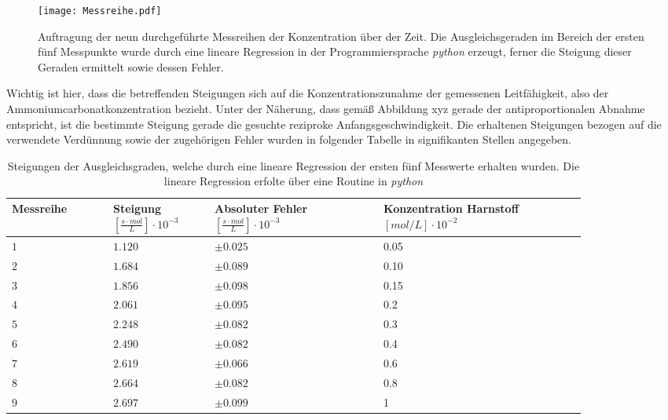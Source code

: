 \begin{figure}[H]
	\centering	
	\begin{minipage}{1\textwidth}
		\texttt{[image: Messreihe.pdf]}
	\end{minipage}
	\caption{Auftragung der neun durchgeführte Messreihen der Konzentration über der Zeit. Die Ausgleichsgeraden im Bereich der ersten fünf Messpunkte wurde durch eine lineare Regression in der Programmiersprache \textit{python} erzeugt, ferner die Steigung dieser Geraden ermittelt sowie dessen Fehler.}
	\label{Messreihe}
\end{figure}
Wichtig ist hier, dass die betreffenden Steigungen sich auf die Konzentrationszunahme der gemessenen Leitfähigkeit, also der Ammoniumcarbonatkonzentration bezieht. Unter der Näherung, dass gemäß Abbildung xyz gerade der antiproportionalen Abnahme entspricht, ist die bestimmte Steigung gerade die gesuchte reziproke Anfangsgeschwindigkeit. Die erhaltenen Steigungen bezogen auf die verwendete Verdünnung sowie der zugehörigen Fehler wurden in folgender Tabelle in signifikanten Stellen angegeben.
\begin{table}[H]
\centering
\label{Steigungstabelle}
	\caption{Steigungen der Ausgleichsgraden, welche durch eine lineare Regression der ersten fünf Messwerte erhalten wurden. Die lineare Regression erfolte über eine Routine in \textit{python}}
	\begin{tabular}{C{0.15\linewidth}|C{0.15\linewidth}C{0.25\linewidth}C{0.3\linewidth}}
		Messreihe  &  Steigung $\left[\si{\frac{s\cdot mol}{L}}\right] \cdot 10^{-3}$ &  Absoluter Fehler $\left[\si{\frac{s \cdot mol}{L}}\right] \cdot 10^{-3}$ & Konzentration Harnstoff $\left[\si{mol/L}\right]\cdot 10^{-2}$ \\
		\hline \addlinespace[1ex] 
		$ 1$ & $1.120$ & $\pm 0.025$ & 0.05\\
		$2$ & $1.684$& $ \pm 0.089$ &0.10\\
		$3$ & $1.856$& $\pm 0.098$ &0.15\\
		$4$ &$2.061$& $\pm 0.095$&0.2\\
		$5$&  $2.248$&  $\pm 0.082$ &0.3\\
		$6$&  $2.490$&  $\pm 0.082$&0.4\\
		$7$ &  $2.619$&$\pm 0.066$&0.6\\
		$8$ & $2.664$&$\pm  0.082$ &0.8\\
		$9$ &  $2.697$& $\pm 0.099$ &1\\
	\end{tabular}
\end{table}
